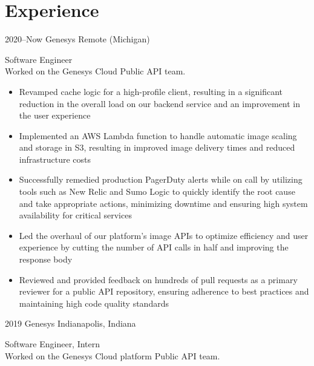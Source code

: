 \documentclass[]{cv-style}
\begin{document}
\section{Experience}
\begin{entrylist}
\entry
{2020--Now}
{Genesys}
{Remote (Michigan)}
{Software Engineer\\
Worked on the Genesys Cloud Public API team.
\begin{itemize}
    \item Revamped cache logic for a high-profile client, resulting in a significant reduction in the overall load on our backend service and an improvement in the user experience
    \item Implemented an AWS Lambda function to handle automatic image scaling and storage in S3, resulting in improved image delivery times and reduced infrastructure costs
    \item Successfully remedied production PagerDuty alerts while on call by utilizing tools such as New Relic and Sumo Logic to quickly identify the root cause and take appropriate actions, minimizing downtime and ensuring high system availability for critical services
    \item Led the overhaul of our platform's image APIs to optimize efficiency and user experience by cutting the number of API calls in half and improving the response body
    \item Reviewed and provided feedback on hundreds of pull requests as a primary reviewer for a public API repository, ensuring adherence to best practices and maintaining high code quality standards
\end{itemize}}
\entry
{2019}
{Genesys}
{Indianapolis, Indiana}
{Software Engineer, Intern\\
Worked on the Genesys Cloud platform Public API team.
\begin{itemize}

\end{itemize}}
\end{entrylist}
\end{document}
